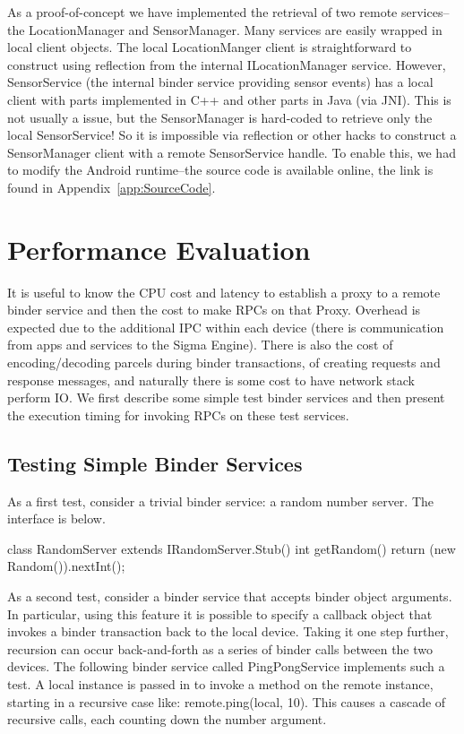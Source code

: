 \documentclass[prodmode]{acmlarge}
\begin{document}
As a proof-of-concept we have implemented the retrieval of two remote services--the LocationManager and SensorManager. Many services are easily wrapped in local client objects. The local LocationManger client is straightforward to construct using reflection from the internal ILocationManager service. However, SensorService (the internal binder service providing sensor events) has a local client with parts implemented in C++ and other parts in Java (via JNI). This is not usually a issue, but the SensorManager is hard-coded to retrieve only the local SensorService! So it is impossible via reflection or other hacks to construct a SensorManager client with a remote SensorService handle. To enable this, we had to modify the Android runtime--the source code is available online, the link is found in Appendix~\ref{app:SourceCode}.

\section{Performance Evaluation}
\label{sec:Performance}
It is useful to know the CPU cost and latency to establish a proxy to a remote binder service and then the cost to make RPCs on that Proxy. Overhead is expected due to the additional IPC within each device (there is communication from apps and services to the Sigma Engine). There is also the cost of encoding/decoding parcels during binder transactions, of creating requests and response messages, and naturally there is some cost to have network stack perform IO. We first describe some simple test binder services and then present the execution timing for invoking RPCs on these test services.

\subsection{Testing Simple Binder Services}
As a first test, consider a trivial binder service: a random number server. The interface is below.

\begin{snippet}
class RandomServer extends IRandomServer.Stub() {
  int getRandom() {
    return (new Random()).nextInt(); }
}
\end{snippet}

As a second test, consider a binder service that accepts binder object arguments. In particular, using this feature it is possible to specify a callback object that invokes a binder transaction back to the local device. Taking it one step further, recursion can occur back-and-forth as a series of binder calls between the two devices. The following binder service called PingPongService implements such a test. A local instance is passed in to invoke a method on the remote instance, starting in a recursive case like: remote.ping(local, 10). This causes a cascade of recursive calls, each counting down the number argument.
\end{document}

